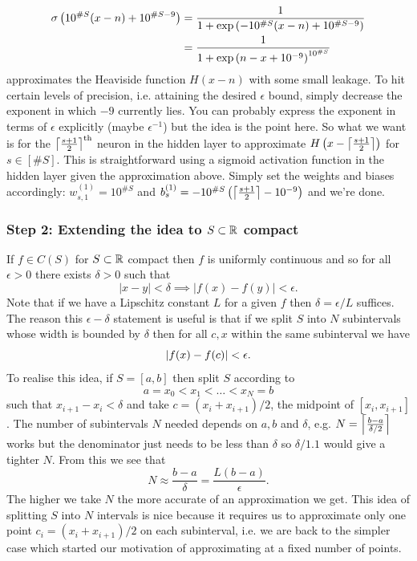 \documentclass[11pt]{article}
\begin{document}
\begin{align*}
    \sigma\left(10^{\#S}(x-n)+10^{\#S-9}\right)
    &=
    \frac{1}{1+\exp\left(-10^{\#S}(x-n)+10^{\#S-9}\right)}\\
    &=
    \frac{1}{1+\exp\left(n-x+10^{-9}\right)^{10^{\#S}}}
\end{align*}
approximates the Heaviside function $H(x-n)$ with some small leakage. To hit certain levels of precision, i.e. attaining the desired $\epsilon$ bound, simply decrease the exponent in which $-9$ currently lies. You can probably express the exponent in terms of $\epsilon$ explicitly (maybe $\epsilon^{-1}$) but the idea is the point here. So what we want is for the $\left\lceil\frac{s+1}{2}\right\rceil^{\text{th}}$ neuron in the hidden layer to approximate $H\left(x-\left\lceil\frac{s+1}{2}\right\rceil\right)$ for $s\in[\#S]$. This is straightforward using a sigmoid activation function in the hidden layer given the approximation above. Simply set the weights and biases accordingly: $w_{s,1}^{(1)}=10^{\#S}$ and $b_s^{(1)}=-10^{\#S}\left(\left\lceil\frac{s+1}{2}\right\rceil-10^{-9}\right)$ and we're done.

\subsubsection*{Step 2: Extending the idea to $S\subset\mathbb{R}$ compact}
If $f\in C(S)$ for $S\subset\mathbb{R}$ compact then $f$ is uniformly continuous and so for all $\epsilon>0$ there exists $\delta>0$ such that
$$
|x-y|<\delta\implies|f(x)-f(y)|<\epsilon.
$$
Note that if we have a Lipschitz constant $L$ for a given $f$ then $\delta=\epsilon/L$ suffices. The reason this $\epsilon-\delta$ statement is useful is that if we split $S$ into $N$ subintervals whose width is bounded by $\delta$ then for all $c,x$ within the same subinterval we have
$$
\left|f(x)-f(c)\right|<\epsilon.
$$
To realise this idea, if $S=[a,b]$ then split $S$ according to
$$
a=x_0<x_1<\dots<x_N=b
$$
such that $x_{i+1}-x_i<\delta$ and take $c=(x_i+x_{i+1})/2$, the midpoint of $[x_i,x_{i+1}]$. The number of subintervals $N$ needed depends on $a,b$ and $\delta$, e.g. $N=\left\lceil\frac{b-a}{\delta/2}\right\rceil$ works but the denominator just needs to be less than $\delta$ so $\delta/1.1$ would give a tighter $N$. From this we see that
$$
N
\approx
\frac{b-a}{\delta}
=
\frac{L(b-a)}{\epsilon}.
$$
The higher we take $N$ the more accurate of an approximation we get. This idea of splitting $S$ into $N$ intervals is nice because it requires us to approximate only one point $c_i=(x_i+x_{i+1})/2$ on each subinterval, i.e. we are back to the simpler case which started our motivation of approximating at a fixed number of points.
\end{document}
